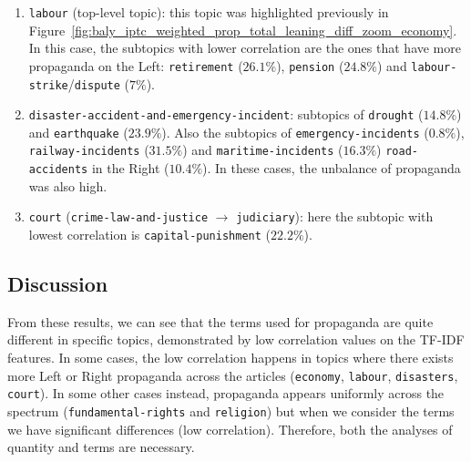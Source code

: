 \begin{enumerate}
    \item \texttt{labour} (top-level topic): this topic was highlighted previously in Figure~\ref{fig:baly_iptc_weighted_prop_total_leaning_diff_zoom_economy}. In this case, the subtopics with lower correlation are the ones that have more propaganda on the Left:  \texttt{retirement} ($26.1\%$), \texttt{pension} ($24.8\%$) and \texttt{labour-strike}/\texttt{dispute} ($7\%$).
    \item \texttt{disaster-accident-and-emergency-incident}: subtopics of \texttt{drought} ($14.8\%$) and \texttt{earthquake} ($23.9\%$). Also the subtopics of \texttt{emergency-incidents} ($0.8\%$), \texttt{railway-incidents} ($31.5\%$) and \texttt{maritime-incidents} ($16.3\%$) \texttt{road-accidents} in the Right ($10.4\%$). In these cases, the unbalance of propaganda was also high.
    \item \texttt{court} (\texttt{crime-law-and-justice} $\rightarrow$ \texttt{judiciary}): here the subtopic with lowest correlation is \texttt{capital-punishment} ($22.2\%$).
\end{enumerate}

\subsection{\statusgreen Discussion}

From these results, we can see that the terms used for propaganda are quite different in specific topics, demonstrated by low correlation values on the TF-IDF features.
In some cases, the low correlation happens in topics where there exists more Left or Right propaganda across the articles (\texttt{economy}, \texttt{labour}, \texttt{disasters}, \texttt{court}). In some other cases instead, propaganda appears uniformly across the spectrum (\texttt{fundamental-rights} and \texttt{religion}) but when we consider the terms we have significant differences (low correlation). Therefore, both the analyses of quantity and terms are necessary.





